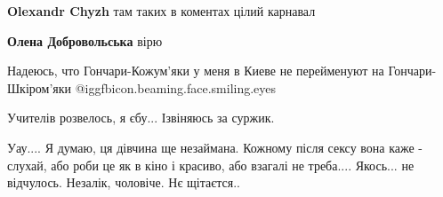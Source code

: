 \begin{itemize} %
 
\textbf{Olexandr Chyzh} там таких в коментах цілий карнавал

 
\textbf{Олена Добровольська} вірю
\end{itemize} %

 
Надеюсь, что Гончари-Кожум'яки у меня в Киеве не перейменуют на Гончари-Шкіром'яки  @igg{fbicon.beaming.face.smiling.eyes} 

 
Учителів розвелось, я єбу... Ізвіняюсь за суржик.

 

Уау.... Я думаю, ця дівчина ще незаймана. Кожному після сексу вона каже -
слухай, або роби це як в кіно і красиво, або взагалі не треба.... Якось... не
відчулось. Незалік, чоловіче. Нє щітаєтся..


 

